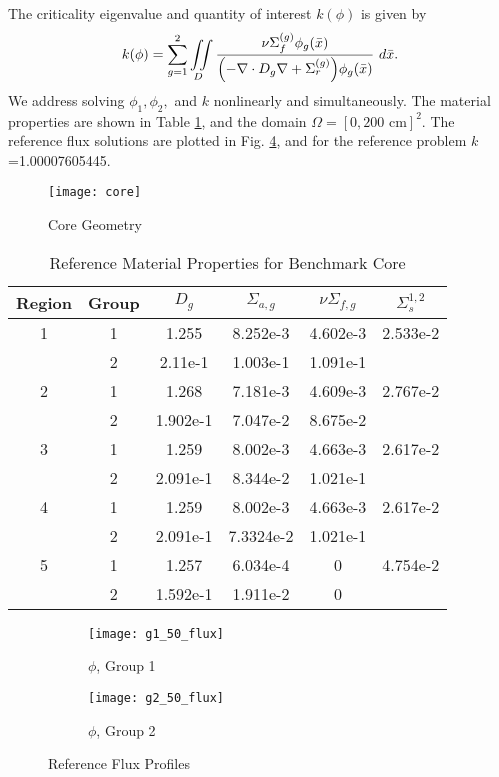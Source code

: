 The criticality eigenvalue and quantity of interest $k(\phi)$ is given by
\begin{equation}
k(\phi)=\sum_{g=1}^2\iint\limits_D\frac{\nu\Sigma_{f}^{(g)}\phi_g(\bar x)}{\qty(-\nabla\cdot D_g\nabla+\Sigma_r^{(g)})\phi_g(\bar x)}~d\bar x.
\end{equation}
We address solving $\phi_1,\phi_2,$ and $k$ nonlinearly and simultaneously.  
The material properties are shown in Table \ref{tab:coremats}, and the domain $\Omega=[0,200\text{ cm}]^2$.
The reference flux solutions are plotted in Fig. \ref{benchflux}, and for the reference problem
$k$=1.00007605445.  \begin{figure}[H]
\centering
  \texttt{[image: core]}
  \caption{Core Geometry}
  \label{geom}
\end{figure}
\begin{table}[h]
\centering
\begin{tabular}{c c | c c c c}
Region & Group & $D_g$ & $\Sigma_{a,g}$ & $\nu\Sigma_{f,g}$ & $\Sigma_s^{1,2}$ \\ \hline
1 & 1 & 1.255 & 8.252e-3 & 4.602e-3 & 2.533e-2 \\
 & 2 & 2.11e-1 & 1.003e-1 & 1.091e-1 & \\ \hline
2 & 1 & 1.268 & 7.181e-3 & 4.609e-3 & 2.767e-2 \\
 & 2 & 1.902e-1 & 7.047e-2 & 8.675e-2 & \\ \hline
3 & 1 & 1.259 & 8.002e-3 & 4.663e-3 & 2.617e-2 \\
 & 2 & 2.091e-1 & 8.344e-2 & 1.021e-1 & \\ \hline
4 & 1 & 1.259 & 8.002e-3 & 4.663e-3 & 2.617e-2 \\
 & 2 & 2.091e-1 & 7.3324e-2 & 1.021e-1 & \\ \hline
5 & 1 & 1.257 & 6.034e-4 & 0 & 4.754e-2 \\
 & 2 & 1.592e-1 & 1.911e-2 & 0 & 
\end{tabular}
\caption{Reference Material Properties for Benchmark Core}
\label{tab:coremats}
\end{table}
\begin{figure}[H]
\centering
  \begin{subfigure}[b]{0.45 \textwidth}
   \texttt{[image: g1\_50\_flux]}
   \caption{$\phi$, Group 1}
   \label{g1}
  \end{subfigure}
  \begin{subfigure}[b]{0.45 \textwidth}
   \texttt{[image: g2\_50\_flux]}
   \caption{$\phi$, Group 2}
   \label{g2}
  \end{subfigure}
  \caption{Reference Flux Profiles}
  \label{benchflux}
\end{figure}



